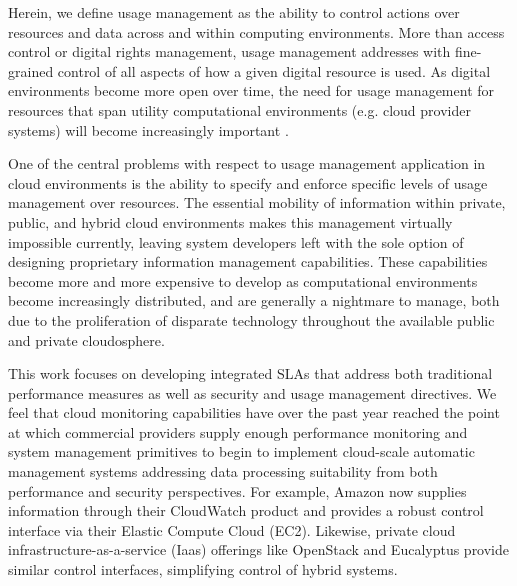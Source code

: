 \documentclass{sig-alternate}
\begin{document}
Herein, we define usage management as the ability to control actions over resources and data across and within computing environments.  More than access control or digital rights management, usage management addresses with fine-grained control of all aspects of how a given digital resource is used.  As digital environments become more open over time, the need for usage management for resources that span utility computational environments (e.g. cloud provider systems) will become increasingly important \cite{ctrl:lamb-MCCCS,ctrl:lamb-SOSE}.

One of the central problems with respect to usage management application in cloud environments is the ability to specify and enforce specific levels of usage management over resources.  The essential mobility of information within private, public, and hybrid cloud environments makes this management virtually impossible currently, leaving system developers left with the sole option of designing proprietary information management capabilities.  These capabilities become more and more expensive to develop as computational environments become increasingly distributed, and are generally a nightmare to manage, both due to the proliferation of disparate technology throughout the available public and private cloudosphere. 

This work focuses on developing integrated SLAs that address both traditional performance measures as well as security and usage management directives.  We feel that cloud monitoring capabilities have over the past year reached the point at which commercial providers supply enough performance monitoring and system management primitives to begin to implement cloud-scale automatic management systems addressing data processing suitability from both performance and security perspectives.  For example, Amazon now supplies information through their CloudWatch product and provides a robust control interface via their Elastic Compute Cloud (EC2).  Likewise, private cloud infrastructure-as-a-service (Iaas) offerings like OpenStack and Eucalyptus provide similar control interfaces, simplifying control of hybrid systems.

\end{document}
